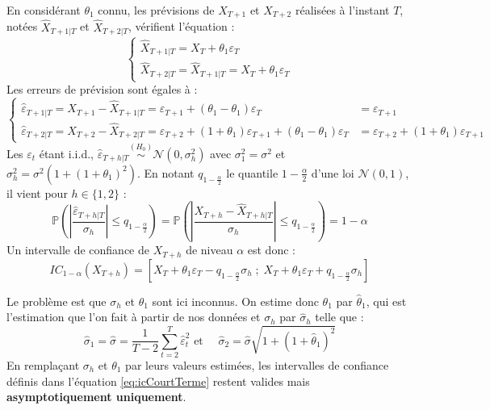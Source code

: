 \documentclass[,french]{article}
\begin{document}
En considérant \(\theta_1\) connu, les prévisions de \(X_{T+1}\) et \(X_{T+2}\) réalisées à l'instant \(T\), notées \(\widehat X_{T+1\vert T}\) et \(\widehat X_{T+2\vert T}\), vérifient l'équation :
\[
\begin{cases}
\widehat X_{T+1\vert T}= X_T + \theta_1\varepsilon_T \\
\widehat X_{T+2\vert T}=\widehat X_{T+1\vert T} =  X_T + \theta_1\varepsilon_T 
\end{cases}
\]
Les erreurs de prévision sont égales à :
\[
\begin{cases}
\widehat \varepsilon_{T+1\vert T} = X_{T+1} - \widehat X_{T+1\vert T}=
\varepsilon_{T+1}+(\theta_1-\theta_1)\varepsilon_T 
&= \varepsilon_{T+1}
\\
\widehat \varepsilon_{T+2\vert T} = X_{T+2} - \widehat X_{T+2\vert T}=
\varepsilon_{T+2}+(1+\theta_1)\varepsilon_{T+1}+(\theta_1-\theta_1)\varepsilon_T 
&=
\varepsilon_{T+2}+(1+\theta_1)\varepsilon_{T+1}
\end{cases}
\]
Les \(\varepsilon_t\) étant i.i.d., \(\widehat \varepsilon_{T+h\vert T} \overset{(H_0)}{\sim}\mathcal N(0,\sigma_h^2)\) avec \(\sigma_1^2=\sigma^2\) et \(\sigma_h^2=\sigma^2(1+(1+\theta_1)^2)\). En notant \(q_{1-\frac \alpha 2}\) le quantile \(1-\frac \alpha 2\) d'une loi \(\mathcal N(0,1)\), il vient pour \(h\in\{1,2\}\) :
\[
\mathbb P\left(
\left\lvert
\frac{\widehat \varepsilon_{T+h\vert T}}{\sigma_h}
\right\rvert\leq q_{1-\frac{\alpha}{2}}
\right)=
\mathbb P\left(
\left\lvert
\frac{X_{T+h} - \widehat X_{T+h\vert T}}{\sigma_h}
\right\rvert\leq q_{1-\frac{\alpha}{2}}
\right)=
1-\alpha
\]
Un intervalle de confiance de \(X_{T+h}\) de niveau \(\alpha\) est donc :
\begin{equation}
IC_{1-\alpha}(X_{T+h}) = \left[
X_T+ \theta_1\varepsilon_T -q_{1-\frac \alpha 2}{\sigma}_h\;;\;
X_T+ \theta_1\varepsilon_T +q_{1-\frac \alpha 2}{\sigma}_h
\right]
\label{eq:icCourtTerme}
\end{equation}

Le problème est que \(\sigma_h\) et \(\theta_1\) sont ici inconnus.
On estime donc \(\theta_1\) par \(\widehat \theta_1\), qui est l'estimation que l'on fait à partir de nos données et \(\sigma_h\) par \(\widehat \sigma_h\) telle que :
\[
\widehat\sigma_1 = \widehat\sigma=  \frac{1}{T-2}\sum_{t=2}^T\widehat\varepsilon_t^2
\text{ et }\quad
\widehat\sigma_2=\widehat\sigma\sqrt{1+(1+\widehat \theta_1)^2}
\]
En remplaçant \(\sigma_h\) et \(\theta_1\) par leurs valeurs estimées, les intervalles de confiance définis dans l'équation \eqref{eq:icCourtTerme} restent valides mais \textbf{asymptotiquement uniquement}.
\end{document}
